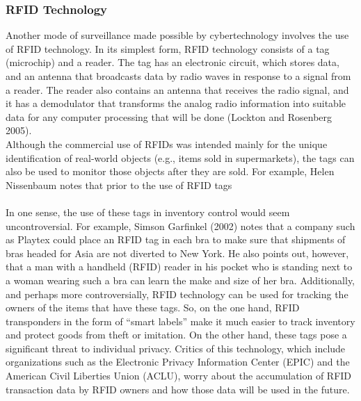 \documentclass[12pt]{article}
\theoremstyle{definition}
\begin{document}
\subsubsection{RFID Technology}
Another mode of surveillance made possible by cybertechnology involves the use of
RFID technology. In its simplest form, RFID technology consists of a tag (microchip) and
a reader. The tag has an electronic circuit, which stores data, and an antenna that
broadcasts data by radio waves in response to a signal from a reader. The reader also
contains an antenna that receives the radio signal, and it has a demodulator that
transforms the analog radio information into suitable data for any computer processing
that will be done (Lockton and Rosenberg 2005).\\
Although the commercial use of RFIDs was intended mainly for the unique
identification of real-world objects (e.g., items sold in supermarkets), the tags can also be used to monitor those objects after they are sold. For example, Helen Nissenbaum
notes that prior to the use of RFID tags\\
\\
In one sense, the use of these tags in inventory control would seem uncontroversial.
For example, Simson Garfinkel (2002) notes that a company such as Playtex could place
an RFID tag in each bra to make sure that shipments of bras headed for Asia are not
diverted to New York. He also points out, however, that a man with a handheld (RFID)
reader in his pocket who is standing next to a woman wearing such a bra can learn the
make and size of her bra. Additionally, and perhaps more controversially, RFID
technology can be used for tracking the owners of the items that have these tags. So,
on the one hand, RFID transponders in the form of “smart labels” make it much easier to
track inventory and protect goods from theft or imitation. On the other hand, these tags
pose a significant threat to individual privacy. Critics of this technology, which include
organizations such as the Electronic Privacy Information Center (EPIC) and the
American Civil Liberties Union (ACLU), worry about the accumulation of RFID
transaction data by RFID owners and how those data will be used in the future.\\
\end{document}
